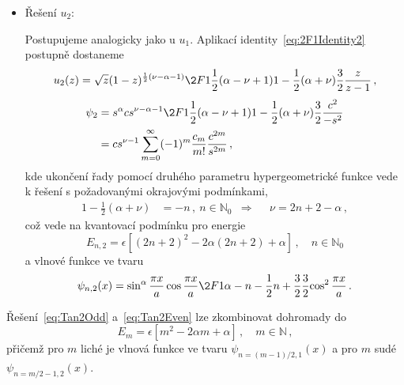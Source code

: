 \begin{solution}
\begin{itemize}
	\item Řešení $u_{2}$:
	
		Postupujeme analogicky jako u $u_{1}$.
		Aplikací identity~\eqref{eq:2F1Identity2} postupně dostaneme
		\begin{equation}
			u_{2}(z)=\sqrt{z}(1-z)^{\frac{1}{2}(\nu-\alpha-1)}
				\2F1{\frac{1}{2}(\alpha-\nu+1)}{1-\frac{1}{2}(\alpha+\nu)}{\frac{3}{2}}
				{\frac{z}{z-1}}\,,
		\end{equation}
		\begin{align}
			\psi_{2}
				&=s^{\alpha}cs^{\nu-\alpha-1}
					\2F1{\frac{1}{2}(\alpha-\nu+1)}{1-\frac{1}{2}(\alpha+\nu)}{\frac{3}{2}}
					{\frac{c^{2}}{-s^{2}}}\nonumber\\
				&=cs^{\nu-1}\sum_{m=0}^{\infty}(-1)^{m}\frac{c_{m}}{m!}\frac{c^{2m}}{s^{2m}}\,,
		\end{align}
		kde ukončení řady pomocí druhého parametru hypergeometrické funkce vede k řešení
		s požadovanými okrajovými podmínkami,
		\begin{align}
			1-\frac{1}{2}(\alpha+\nu)&=-n\,,\ n\in\mathbb{N}_{0}
			&\Longrightarrow&&\nu=2n+2-\alpha\,,
		\end{align}
		což vede na kvantovací podmínku pro energie
		\begin{equation}
			\label{eq:Tan2Even}
			E_{n,2}=\epsilon\left[(2n+2)^{2}-2\alpha(2n+2)+\alpha\right]\,,\quad n\in\mathbb{N}_{0}
		\end{equation}
		a vlnové funkce ve tvaru
		\begin{equation}
		\psi_{n,2}(x)=\sin^{\alpha}\frac{\pi x}{a}\cos\frac{\pi x}{a}
			\2F1{\alpha-n-\frac{1}{2}}{n+\frac{3}{2}}{\frac{3}{2}}{\cos^{2}\frac{\pi x}{a}}\,.
		\end{equation}
	\end{itemize}
	
	Řešení~\eqref{eq:Tan2Odd} a~\eqref{eq:Tan2Even} lze zkombinovat dohromady do
	\begin{equation}
		E_{m}=\epsilon\left[m^{2}-2\alpha m+\alpha\right]\,,\quad m\in\mathbb{N}\,,
	\end{equation}
	přičemž pro $m$ liché je vlnová funkce ve tvaru $\psi_{n=(m-1)/2,1}(x)$ a pro $m$ sudé
	$\psi_{n=m/2-1,2}(x)$.
	

\end{solution}
